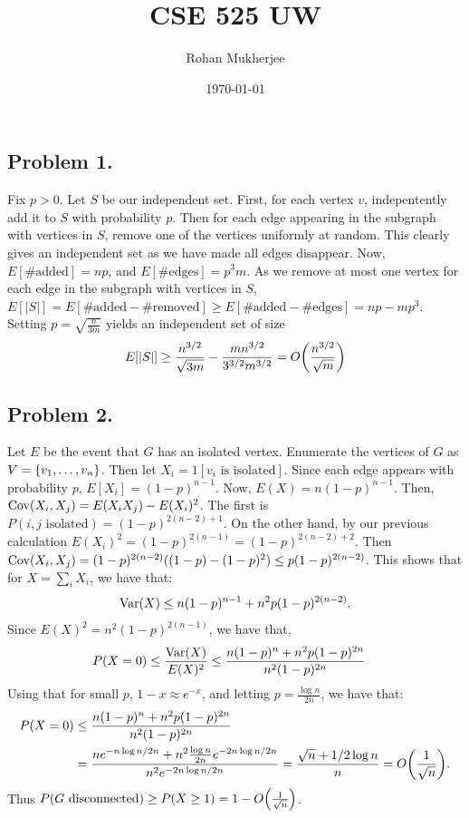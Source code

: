 \documentclass[12pt]{article}
\title{CSE 525 UW}
\date{\today}
\author{Rohan Mukherjee}
\newcommand{\Cov}{\mathrm{Cov}\qty}
\newcommand{\Var}{\mathrm{Var}\qty}
\newcommand{\SET}[1]{\Set{\mskip-\medmuskip #1 \mskip-\medmuskip}}
\begin{document}
    \maketitle
    \subsection*{Problem 1.}
    Fix $p > 0$. Let $S$ be our independent set. First, for each vertex $v$, indepentently add it to $S$ with probability $p$. Then for each edge appearing in the subgraph with vertices in $S$, remove one of the vertices uniformly at random. This clearly gives an independent set as we have made all edges disappear. Now, $E[\text{\# added}] = np$, and $E[\text{\# edges}] = p^3 m$. As we remove at most one vertex for each edge in the subgraph with vertices in $S$, $E[|S|] = E[\text{\# added} - \text{\# removed}] \geq E[\text{\# added} - \text{\# edges}] = np - mp^3$. Setting $p = \sqrt{\frac{n}{3m}}$ yields an independent set of size
    \begin{align*}
        E[|S|] \geq \frac{n^{3/2}}{\sqrt{3m}} - \frac{mn^{3/2}}{3^{3/2} m^{3/2}} = O\qty(\frac{n^{3/2}}{\sqrt{m}})
    \end{align*}

    \subsection*{Problem 2.}
    Let $E$ be the event that $G$ has an isolated vertex. Enumerate the vertices of $G$ as $V = \SET{v_1, \ldots, v_n}$. Then let $X_i= 1[v_i \text{ is isolated}]$. Since each edge appears with probability $p$, $E[X_i] = (1-p)^{n-1}$. Now, $E(X) = n(1-p)^{n-1}$. Then, $\Cov(X_i,X_j) = E(X_iX_j) - E(X_i)^2$. The first is $P(\text{$i,j$ isolated}) = (1-p)^{2(n-2)+1}$. On the other hand, by our previous calculation $E(X_i)^2 = (1-p)^{2(n-1)} = (1-p)^{2(n-2)+2}$. Then $\Cov(X_i,X_j) = (1-p)^{2(n-2)}((1-p) - (1-p)^2) \leq p(1-p)^{2(n-2)}$. This shows that for $X = \sum_i X_i$, we have that:
    \begin{align*}
        \Var(X) \leq n(1-p)^{n-1} + n^2p(1-p)^{2(n-2)}.
    \end{align*}
    Since $E(X)^2 = n^2(1-p)^{2(n-1)}$, we have that,
    \begin{align*}
        P(X = 0) &\leq \frac{\Var(X)}{E(X)^2} \leq \frac{n(1-p)^n + n^2p(1-p)^{2n}}{n^2(1-p)^{2n}}
    \end{align*}
    Using that for small $p$, $1-x \approx e^{-x}$, and letting $p = \frac{\log n}{2n}$, we have that:
    \begin{align*}
        P(X = 0) &\leq \frac{n(1-p)^n + n^2p(1-p)^{2n}}{n^2(1-p)^{2n}} \\
        &= \frac{n e^{-n \log n/ 2n} + n^2 \frac{\log n}{2n} e^{-2n \log n/2n}}{n^2 e^{-2n \log n/2n}} = \frac{\sqrt{n} + 1/2 \log n}{n} = O \qty(\frac{1}{\sqrt{n}}).
    \end{align*}
    Thus $P(\text{$G$ disconnected}) \geq P(X \geq 1) = 1 - O \qty(\frac{1}{\sqrt n})$.
\end{document}
